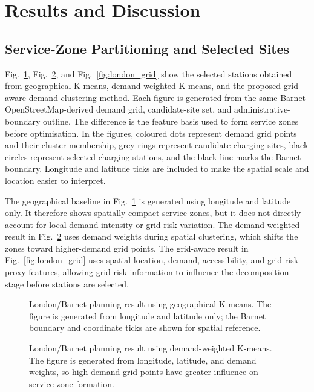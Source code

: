 \section{Results and Discussion}

\subsection{Service-Zone Partitioning and Selected Sites}
Fig.~\ref{fig:london_geo}, Fig.~\ref{fig:london_demand}, and Fig.~\ref{fig:london_grid} show the selected stations obtained from geographical K-means, demand-weighted K-means, and the proposed grid-aware demand clustering method. Each figure is generated from the same Barnet OpenStreetMap-derived demand grid, candidate-site set, and administrative-boundary outline. The difference is the feature basis used to form service zones before optimisation. In the figures, coloured dots represent demand grid points and their cluster membership, grey rings represent candidate charging sites, black circles represent selected charging stations, and the black line marks the Barnet boundary. Longitude and latitude ticks are included to make the spatial scale and location easier to interpret.

The geographical baseline in Fig.~\ref{fig:london_geo} is generated using longitude and latitude only. It therefore shows spatially compact service zones, but it does not directly account for local demand intensity or grid-risk variation. The demand-weighted result in Fig.~\ref{fig:london_demand} uses demand weights during spatial clustering, which shifts the zones toward higher-demand grid points. The grid-aware result in Fig.~\ref{fig:london_grid} uses spatial location, demand, accessibility, and grid-risk proxy features, allowing grid-risk information to influence the decomposition stage before stations are selected.

\begin{figure}[!t]
\centering

\caption{London/Barnet planning result using geographical K-means. The figure is generated from longitude and latitude only; the Barnet boundary and coordinate ticks are shown for spatial reference.}
\label{fig:london_geo}
\end{figure}

\begin{figure}[!t]
\centering

\caption{London/Barnet planning result using demand-weighted K-means. The figure is generated from longitude, latitude, and demand weights, so high-demand grid points have greater influence on service-zone formation.}
\label{fig:london_demand}
\end{figure}

